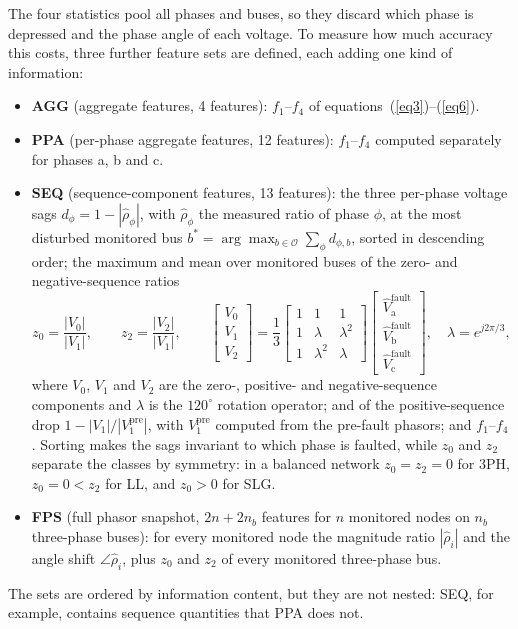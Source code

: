 \documentclass[11pt]{article}
\newenvironment{nw}{}{}
\begin{document}
\begin{nw}
The four statistics pool all phases and buses, so they discard which phase is depressed and the phase angle of each voltage. To measure how much accuracy this costs, three further feature sets are defined, each adding one kind of information:
\begin{itemize}
\item \textbf{AGG} (aggregate features, 4 features): $f_1$--$f_4$ of equations~(\ref{eq3})--(\ref{eq6}).
\item \textbf{PPA} (per-phase aggregate features, 12 features): $f_1$--$f_4$ computed separately for phases a, b and c.
\item \textbf{SEQ} (sequence-component features, 13 features): the three per-phase voltage sags $d_\phi=1-|\hat\rho_\phi|$, with $\hat\rho_\phi$ the measured ratio of phase $\phi$, at the most disturbed monitored bus $b^\ast=\arg\max_{b\in\mathcal{O}}\sum_\phi d_{\phi,b}$, sorted in descending order; the maximum and mean over monitored buses of the zero- and negative-sequence ratios
\begin{equation}\label{eq7}
z_0=\frac{|V_0|}{|V_1|},\qquad z_2=\frac{|V_2|}{|V_1|},\qquad
\begin{bmatrix}V_0\\V_1\\V_2\end{bmatrix}=\frac13\begin{bmatrix}1&1&1\\1&\lambda&\lambda^2\\1&\lambda^2&\lambda\end{bmatrix}\begin{bmatrix}\hat V^{\mathrm{fault}}_{\mathrm{a}}\\\hat V^{\mathrm{fault}}_{\mathrm{b}}\\\hat V^{\mathrm{fault}}_{\mathrm{c}}\end{bmatrix},\quad \lambda=e^{j2\pi/3},
\end{equation}
where $V_0$, $V_1$ and $V_2$ are the zero-, positive- and negative-sequence components and $\lambda$ is the $120^\circ$ rotation operator; and of the positive-sequence drop $1-|V_1|/|V_1^{\mathrm{pre}}|$, with $V_1^{\mathrm{pre}}$ computed from the pre-fault phasors; and $f_1$--$f_4$. Sorting makes the sags invariant to which phase is faulted, while $z_0$ and $z_2$ separate the classes by symmetry: in a balanced network $z_0=z_2=0$ for 3PH, $z_0=0<z_2$ for LL, and $z_0>0$ for SLG.
\item \textbf{FPS} (full phasor snapshot, $2n+2n_b$ features for $n$ monitored nodes on $n_b$ three-phase buses): for every monitored node the magnitude ratio $|\hat\rho_i|$ and the angle shift $\angle\hat\rho_i$, plus $z_0$ and $z_2$ of every monitored three-phase bus.
\end{itemize}
The sets are ordered by information content, but they are not nested: SEQ, for example, contains sequence quantities that PPA does not.


\end{nw}
\end{document}
